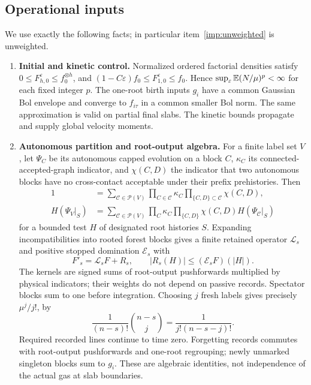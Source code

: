 \documentclass[11pt,letterpaper]{article}
\numberwithin{equation}{section}
\theoremstyle{definition}\newtheorem{assumption}[theorem]{Assumption}
\theoremstyle{remark}\newtheorem{remark}[theorem]{Remark}
\newcommand{\eps}{\varepsilon}\newcommand{\dd}{\,\mathrm d}
\begin{document}
\subsection{Operational inputs}
We use exactly the following facts; in particular item~\ref{imp:unweighted} is unweighted.
\begin{enumerate}[label=H\arabic*.,ref=H\arabic*,leftmargin=2.7em]
\item\label{imp:initial} \textbf{Initial and kinetic control.}
Normalized ordered factorial densities satisfy $0\le F_{h,0}^\eps\le f_0^{\otimes h}$, and $(1-C\eps)f_0\le F_{1,0}^\eps\le f_0$. Hence $\sup_\eps\E(N/\mu)^p<\infty$ for each fixed integer $p$. The one-root birth inputs $g_i$ have a common Gaussian Bol envelope and converge to $f_{i\tau}$ in a common smaller Bol norm. The same approximation is valid on partial final slabs. The kinetic bounds propagate and supply global velocity moments.

\item\label{imp:algebra} \textbf{Autonomous partition and root-output algebra.}
For a finite label set $V$, let $\Psi_C$ be its autonomous capped evolution on a block $C$, $\kappa_C$ its connected-accepted-graph indicator, and $\chi(C,D)$ the indicator that two autonomous blocks have no cross-contact acceptable under their prefix prehistories. Then
\begin{align}
 1&=\sum_{\mathcal C\in\mathcal P(V)}\prod_{C\in\mathcal C}\kappa_C
                         \prod_{\{C,D\}\subset\mathcal C}\chi(C,D),\label{eq:partition}\\
 H(\Psi_V|_S)&=\sum_{\mathcal C\in\mathcal P(V)}\prod_C\kappa_C
             \prod_{\{C,D\}}\chi(C,D)H(\Psi_{\mathcal C}|_S)\label{eq:rootoutput}
\end{align}
for a bounded test $H$ of designated root histories $S$. Expanding incompatibilities into rooted forest blocks gives a finite retained operator $\mathcal L_s$ and positive stopped domination $\mathcal E_s$ with
\[
 F'_s=\mathcal L_sF+R_s,\qquad |R_s(H)|\le(\mathcal E_sF)(|H|).
\]
The kernels are signed sums of root-output pushforwards multiplied by physical indicators; their weights do not depend on passive records. Spectator blocks sum to one before integration. Choosing $j$ fresh labels gives precisely $\mu^j/j!$, by
\[
 \frac1{(n-s)!}\binom{n-s}{j}=\frac1{j!(n-s-j)!}.
\]
Required recorded lines continue to time zero. Forgetting records commutes with root-output pushforwards and one-root regrouping; newly unmarked singleton blocks sum to $g_i$. These are algebraic identities, not independence of the actual gas at slab boundaries.


\end{enumerate}
\end{document}
